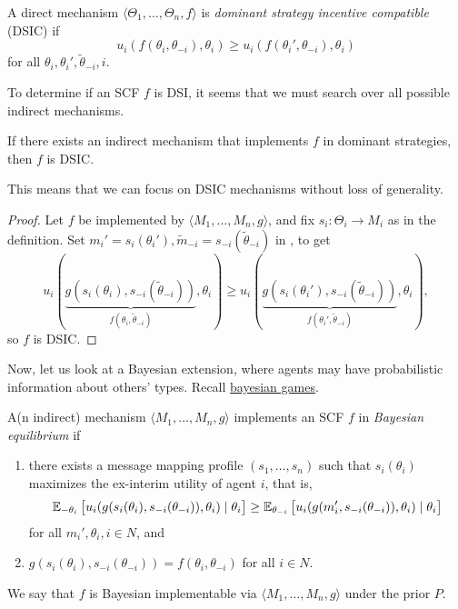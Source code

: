 	\begin{fdef}
		\label{def: dsic}
		A direct mechanism $\langle \Theta_1,\ldots,\Theta_n,f\rangle$ is \emph{dominant strategy incentive compatible} (DSIC) if
		\begin{equation}
			\label{eqn: dsic}
			u_i(f(\theta_i,\theta_{-i}),\theta_i) \ge u_i(f(\theta_i',\theta_{-i}),\theta_i)
		\end{equation}
		for all $\theta_i,\theta_i',\widetilde{\theta}_{-i},i$.
	\end{fdef}

	To determine if an SCF $f$ is DSI, it seems that we must search over all possible indirect mechanisms.

	\begin{ftheo}
		If there exists an indirect mechanism that implements $f$ in dominant strategies, then $f$ is DSIC.
	\end{ftheo}
	This means that we can focus on DSIC mechanisms without loss of generality.
	\begin{proof}
		Let $f$ be implemented by $\langle M_1,\ldots,M_n,g\rangle$, and fix $s_i : \Theta_i \to M_i$ as in the definition. Set $m_i' = s_i(\theta_i'), \widetilde{m}_{-i} = s_{-i}(\widetilde{\theta}_{-i})$ in , to get
		\[ u_i(\underbrace{g(s_i(\theta_i),s_{-i}(\widetilde{\theta}_{-i}))}_{f(\theta_i,\widetilde\theta_{-i})},\theta_i) \ge u_i(\underbrace{g(s_i(\theta_i'),s_{-i}(\widetilde\theta_{-i}))}_{f(\theta_i',\widetilde\theta_{-i})},\theta_i), \]
		so $f$ is DSIC.
	\end{proof}

	Now, let us look at a Bayesian extension, where agents may have probabilistic information about others' types. Recall \hyperref[def: bayesian game]{bayesian games}.

	\begin{fdef}
		A(n indirect) mechanism $\langle M_1,\ldots,M_n,g\rangle$ implements an SCF $f$ in \emph{Bayesian equilibrium} if
		\begin{enumerate}
			\item there exists a message mapping profile $(s_1,\ldots,s_n)$ such that $s_i(\theta_i)$ maximizes the ex-interim utility of agent $i$, that is,
			\[ \mathbb{E}_{-\theta_i} \left[ u_i(g(s_i(\theta_i),s_{-i}(\theta_{-i})),\theta_i) \mid \theta_i \right] \ge \mathbb{E}_{\theta_{-i}} \left[ u_i(g(m_i',s_{-i}(\theta_{-i})),\theta_i) \mid \theta_i \right] \]
			for all $m_i',\theta_i,i\in N$, and
			\item $g(s_i(\theta_i),s_{-i}(\theta_{-i})) = f(\theta_i,\theta_{-i})$ for all $i \in N$.
		\end{enumerate}	
		We say that $f$ is Bayesian implementable via $\langle M_1,\ldots,M_n,g\rangle$ under the prior $P$.
	\end{fdef}

